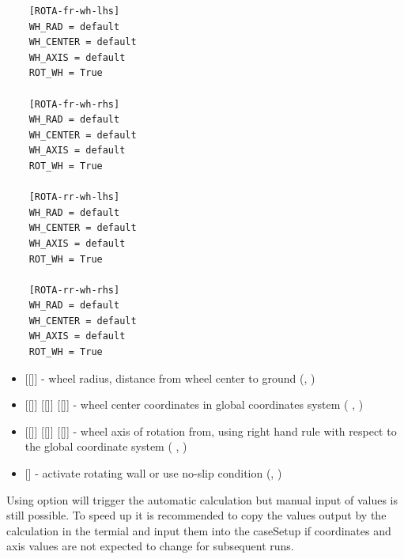 \begin{lstlisting}
    [ROTA-fr-wh-lhs]
    WH_RAD = default
    WH_CENTER = default
    WH_AXIS = default
    ROT_WH = True

    [ROTA-fr-wh-rhs]
    WH_RAD = default
    WH_CENTER = default
    WH_AXIS = default
    ROT_WH = True

    [ROTA-rr-wh-lhs]
    WH_RAD = default
    WH_CENTER = default
    WH_AXIS = default
    ROT_WH = True

    [ROTA-rr-wh-rhs]
    WH_RAD = default
    WH_CENTER = default
    WH_AXIS = default
    ROT_WH = True

\end{lstlisting}
\begin{itemize}
    \item {} [[]] - wheel radius, distance from wheel center to ground (, )
    \item {} [[]] [[]] [[]] - wheel center coordinates in global coordinates system (  , )
    \item {} [[]] [[]] [[]] - wheel axis of rotation from, using right hand rule with respect to the global coordinate system (  , )
    \item {} [] - activate rotating wall or use no-slip condition (, )
\end{itemize}
Using  option will trigger the automatic calculation but manual input of values is still possible. To speed up  it is recommended to copy the values output by the calculation in the termial and input them into the caseSetup if coordinates and axis values are not expected to change for subsequent runs.

